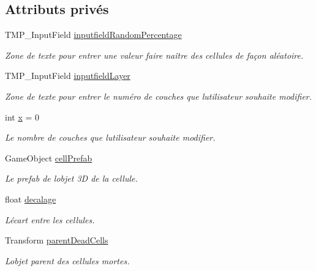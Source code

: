 \subsection*{Attributs privés}
\begin{DoxyCompactItemize}
\item 
T\+M\+P\+\_\+\+Input\+Field \mbox{\hyperlink{class_edit_mode_manager_a8f714287067b2bdf21ff8ab45e72dfba}{inputfield\+Random\+Percentage}}
\begin{DoxyCompactList}\small\item\em Zone de texte pour entrer une valeur faire naître des cellules de façon aléatoire. \end{DoxyCompactList}\item 
T\+M\+P\+\_\+\+Input\+Field \mbox{\hyperlink{class_edit_mode_manager_ad36781169457109afdb5b11d2766bde7}{inputfield\+Layer}}
\begin{DoxyCompactList}\small\item\em Zone de texte pour entrer le numéro de couches que l\textquotesingle{}utilisateur souhaite modifier. \end{DoxyCompactList}\item 
int \mbox{\hyperlink{class_edit_mode_manager_ab22d78b821b9c0e8a939ef89abe37f5f}{x}} = 0
\begin{DoxyCompactList}\small\item\em Le nombre de couches que l\textquotesingle{}utilisateur souhaite modifier. \end{DoxyCompactList}\item 
Game\+Object \mbox{\hyperlink{class_edit_mode_manager_afbeb266fcf4af2980b1cd76a64b3ce91}{cell\+Prefab}}
\begin{DoxyCompactList}\small\item\em Le prefab de l\textquotesingle{}objet 3D de la cellule. \end{DoxyCompactList}\item 
float \mbox{\hyperlink{class_edit_mode_manager_acecef311540113a1ef783ad637c7bf6c}{decalage}}
\begin{DoxyCompactList}\small\item\em L\textquotesingle{}écart entre les cellules. \end{DoxyCompactList}\item 
Transform \mbox{\hyperlink{class_edit_mode_manager_a95ebb6471df3c826b6295182d144d570}{parent\+Dead\+Cells}}
\begin{DoxyCompactList}\small\item\em L\textquotesingle{}objet parent des cellules mortes. \end{DoxyCompactList}\item 

\end{DoxyCompactItemize}
